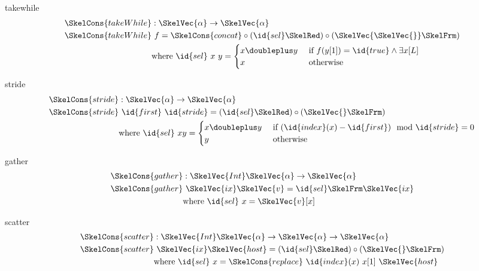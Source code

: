 \documentclass[preview]{standalone}
\begin{document}
\begin{docimage}{takewhile}
  \begin{align*}
    \SkelCons{takeWhile} &: \SkelVec{\alpha} \rightarrow \SkelVec{\alpha} \\
    \SkelCons{takeWhile} &\ f = \SkelCons{concat} \circ (\id{sel} \SkelRed) \circ (\SkelVec{\SkelVec{}} \SkelFrm) \\
                   & \mbox{where }\id{sel}\ x\ y= \begin{cases}
                     x \doubleplus y &\mbox{ if } f(y[1]) = \id{true} \wedge \exists x[L] \\
                     x & \mbox{ otherwise}
                   \end{cases}
  \end{align*}
\end{docimage}

\begin{docimage}{stride}
  \begin{align*}
    \SkelCons{stride} &: \SkelVec{\alpha} \rightarrow \SkelVec{\alpha} \\
    \SkelCons{stride} &\ \id{first}\ \id{stride} = (\id{sel} \SkelRed) \circ (\SkelVec{} \SkelFrm) \\
                   & \mbox{where }\id{sel}\ x y = \begin{cases}
                     x \doubleplus y &\mbox{ if } (\id{index}(x) - \id{first}) \mod \id{stride} = 0  \\
                     y & \mbox{ otherwise}
                   \end{cases}
  \end{align*}
\end{docimage}

\begin{docimage}{gather}
  \begin{align*}
    \SkelCons{gather} &: \SkelVec{Int} \SkelVec{\alpha} \rightarrow \SkelVec{\alpha} \\
    \SkelCons{gather} &\ \SkelVec{ix} \SkelVec{v}= \id{sel} \SkelFrm \SkelVec{ix} \\
                   & \mbox{where }\id{sel}\ x = \SkelVec{v}[x]
  \end{align*}
\end{docimage}

\begin{docimage}{scatter}
  \begin{align*}
    \SkelCons{scatter} &: \SkelVec{Int} \SkelVec{\alpha} \rightarrow \SkelVec{\alpha} \rightarrow \SkelVec{\alpha} \\
    \SkelCons{scatter} &\ \SkelVec{ix} \SkelVec{host} = (\id{sel} \SkelRed) \circ (\SkelVec{} \SkelFrm) \\
                   & \mbox{where }\id{sel}\ x = \SkelCons{replace}\ \id{index}(x)\ x[1]\  \SkelVec{host} 
  \end{align*}
\end{docimage}
\end{document}
